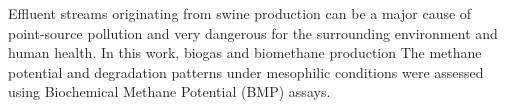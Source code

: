 Effluent streams originating from swine production can be a major cause of point-source pollution and very dangerous for the surrounding environment and human health. In this work, biogas and biomethane production The methane potential and degradation patterns under mesophilic conditions were assessed using Biochemical Methane Potential (BMP) assays.